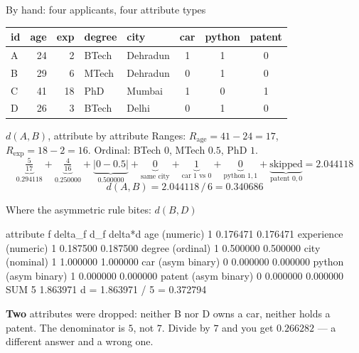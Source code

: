 \documentclass[aspectratio=169]{beamer}
\begin{document}
\begin{frame}[shrink=4]{By hand: four applicants, four attribute types}
  \begin{center}
    \small
    \begin{tabular}{lrrllccc}
      \toprule
      id & age & exp & degree & city & car & python & patent \\
      \midrule
      A & 24 & 2 & BTech & Dehradun & 1 & 1 & 0 \\
      B & 29 & 6 & MTech & Dehradun & 0 & 1 & 0 \\
      C & 41 & 18 & PhD & Mumbai & 1 & 0 & 1 \\
      D & 26 & 3 & BTech & Delhi & 0 & 1 & 0 \\
      \bottomrule
    \end{tabular}
  \end{center}
  \begin{exampleblock}{$d(A,B)$, attribute by attribute}
    \small
    Ranges: $R_{\text{age}} = 41-24 = 17$, $R_{\text{exp}} = 18-2 = 16$.
    Ordinal: BTech $0$, MTech $0.5$, PhD $1$.
    \[
      \underbrace{\tfrac{5}{17}}_{0.294118}
      + \underbrace{\tfrac{4}{16}}_{0.250000}
      + \underbrace{|0-0.5|}_{0.500000}
      + \underbrace{0}_{\text{same city}}
      + \underbrace{1}_{\text{car } 1\text{ vs }0}
      + \underbrace{0}_{\text{python }1,1}
      + \underbrace{\text{skipped}}_{\text{patent } 0,0}
      = 2.044118
    \]
    \[ d(A,B) = 2.044118 \,/\, 6 = \mathbf{0.340686} \]
  \end{exampleblock}
\end{frame}

\begin{frame}[fragile]{Where the asymmetric rule bites: $d(B,D)$}
\begin{outblk}
attribute f            delta_f        d_f      delta*d
age (numeric)                1   0.176471     0.176471
experience (numeric)         1   0.187500     0.187500
degree (ordinal)             1   0.500000     0.500000
city (nominal)               1   1.000000     1.000000
car (asym binary)            0   0.000000     0.000000
python (asym binary)         1   0.000000     0.000000
patent (asym binary)         0   0.000000     0.000000
SUM                          5                1.863971
d = 1.863971 / 5 = 0.372794
\end{outblk}
  \begin{center}
    \small \textbf{Two} attributes were dropped: neither B nor D owns a car,
    neither holds a patent. The denominator is $5$, not $7$. Divide by $7$
    and you get $0.266282$ --- a different answer and a wrong one.
  \end{center}
\end{frame}
\end{document}
